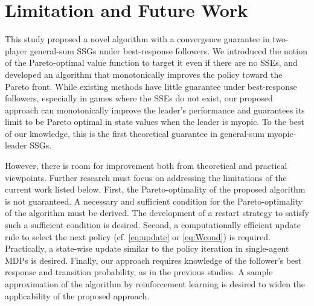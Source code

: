 \documentclass{acml}
\begin{document}
\section{Limitation and Future Work}\label{sec:conclusion}



This study proposed a novel algorithm with a convergence guarantee in two-player general-sum SSGs under best-response followers.
We introduced the notion of the Pareto-optimal value function to target it even if there are no SSEs, and developed an algorithm that monotonically improves the policy toward the Pareto front.
While existing methods have little guarantee under best-response followers, especially in games where the SSEs do not exist, our proposed approach can monotonically improve the leader's performance and guarantees its limit to be Pareto optimal in state values when the leader is myopic.
To the best of our knowledge, this is the first theoretical guarantee in general-sum myopic-leader SSGs.

However, there is room for improvement both from theoretical and practical viewpoints.
Further research must focus on addressing the limitations of the current work listed below. 
%
First, the Pareto-optimality of the proposed algorithm is not guaranteed. A necessary and sufficient condition for the Pareto-optimality of the algorithm must be derived. The development of a restart strategy to satisfy such a sufficient condition is desired.
%
Second, a computationally efficient update rule to select the next policy (cf. \cref{eq:update} or \cref{eq:Wcond}) is required. Practically, a state-wise update similar to the policy iteration in single-agent MDPs is desired. 
%
Finally, our approach requires knowledge of the follower's best response and transition probability, as in the previous studies. A sample approximation of the algorithm by reinforcement learning is desired to widen the applicability of the proposed approach. 
\end{document}

